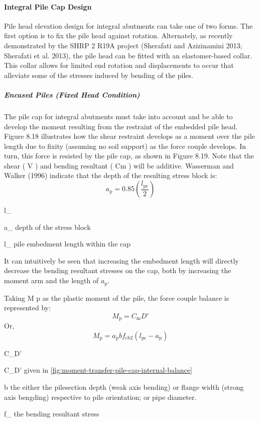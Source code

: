 \paragraph{Integral Pile Cap Design}
Pile head elevation design for integral abutments can take one of two forms. The first option is to fix the pile head
against rotation. Alternately, as recently demonstrated by the SHRP 2 R19A project (Sherafati and Azizinamini 2013; Sherafati et al. 2013), the pile head can be fitted with an elastomer-based collar. This collar allows for limited end
rotation and displacements to occur that alleviate some of the stresses induced by bending of the piles.

\subparagraph{Encased Piles (Fixed Head Condition)}
The pile cap for integral abutments must take into account and be able to develop the moment resulting from the
restraint of the embedded pile head. Figure 8.18 illustrates how the shear restraint develops as a moment over the pile
length due to fixity (assuming no soil support) as the force couple develops. In turn, this force is resisted by the pile
cap, as shown in Figure 8.19. Note that the shear ( V ) and bending resultant ( Cm ) will be additive. Wasserman and
Walker (1996) indicate that the depth of the resulting stress block is:
\begin{equation}
  a_\text{p}= 0.85\left(\frac{l_\text{pc}}{2}\right)
\end{equation}
\begin{EqDesc}{l_}
  \item [a_\text{p}] depth of the stress block
  \item [l_\text{pc}] pile embedment length within the cap
\end{EqDesc}

It can intuitively be seen that increasing the embedment length will directly decrease the bending resultant stresses on the cap, both by increasing the moment arm and the length of $a_\text{p}$.

Taking M p as the plastic moment of the pile, the force couple balance is represented by:
\begin{equation}
  M_\text{p}=C_\text{m}D'
\end{equation}
Or,
\begin{equation}
  M_\text{p}=a_\text{p}bf_\text{cb2}(l_\text{pc}-a_\text{p})
\end{equation}
\begin{EqDesc}{C_D'}
  \item[C_\text{m}\text{和}D'] given in \cref{fig:moment-transfer-pile-cap-internal-balance}
  \item[b] the either the pilesection depth (weak axis bending) or flange width (strong axis bengding) respective to pile orientation; or pipe diameter.
  \item[f_\text{cb2}] the bending resultant stress
\end{EqDesc}

